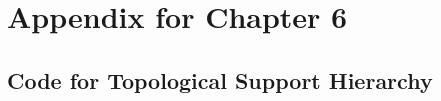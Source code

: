 
\graphicspath{{./\figurefolder/6ZeroWaste/}}


\clearpage
\chapter{Appendix for Chapter 6}




\newpage
\section{Code for Topological Support Hierarchy} \label{sec:appendixa}

